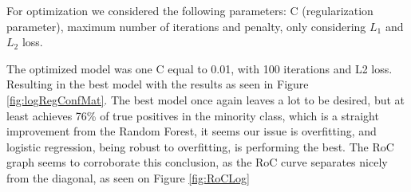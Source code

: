 \documentclass[11pt, a4paper]{article}
\begin{document}
For optimization we considered the following parameters: C (regularization parameter), maximum number of iterations and penalty, only considering $L_1$ and $L_2$ loss.

The optimized model was one C equal to 0.01, with 100 iterations and L2 loss. Resulting in the best model with the results as seen in Figure \ref{fig:logRegConfMat}.  The best model once again leaves a lot to be desired, but at least achieves 76\% of true positives in the minority class, which is a straight improvement from the Random Forest, it seems our issue is overfitting, and logistic regression, being robust to overfitting, is performing the best. The RoC graph seems to corroborate this conclusion, as the RoC curve separates nicely from the diagonal, as seen on Figure \ref{fig:RoCLog}

\end{document}
